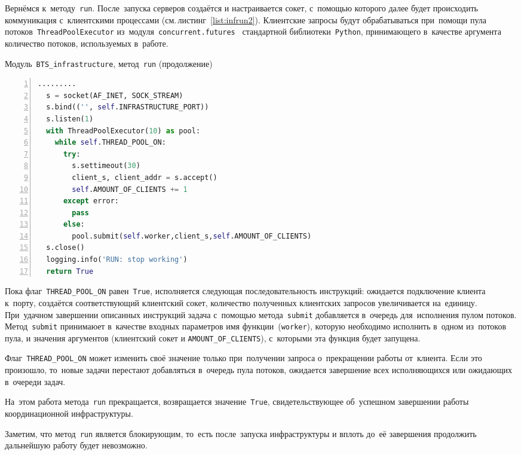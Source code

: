 Вернёмся к~методу~\texttt{run}. После~запуска серверов создаётся и настраивается сокет, с~помощью которого далее будет происходить коммуникация с~клиентскими процессами (см.\,листинг~\ref{list:infrun2}). Клиентские запросы будут обрабатываться при~помощи пула потоков~\texttt{ThreadPoolExecutor} из~модуля~\texttt{concurrent.futures}~\autocite{concurrent} стандартной библиотеки~\texttt{Python}, принимающего в~качестве аргумента количество потоков, используемых в~работе.
\begin{ListingEnv}\caption{Модуль~\texttt{BTS\_infrastructure}, метод~\texttt{run} (продолжение)}\label{list:infrun2}
	\begin{lstlisting}[language=Python, numbers=left]
  .........
  s = socket(AF_INET, SOCK_STREAM)
  s.bind(('', self.INFRASTRUCTURE_PORT))
  s.listen(1)
  with ThreadPoolExecutor(10) as pool:
    while self.THREAD_POOL_ON:
      try:
        s.settimeout(30)
        client_s, client_addr = s.accept()
        self.AMOUNT_OF_CLIENTS += 1
      except error:
        pass
      else:
        pool.submit(self.worker,client_s,self.AMOUNT_OF_CLIENTS)
  s.close()  
  logging.info('RUN: stop working')
  return True
	\end{lstlisting}
\end{ListingEnv}
Пока флаг~\texttt{THREAD_POOL_ON} равен~\texttt{True}, исполняется следующая последовательность инструкций: ожидается подключение клиента к~порту, создаётся соответствующий клиентский сокет, количество полученных клиентских запросов увеличивается на~единицу. При~удачном завершении описанных инструкций задача с~помощью метода~\texttt{submit} добавляется в~очередь для~исполнения пулом потоков. Метод~\texttt{submit} принимаюет в~качестве входных параметров имя функции~(\texttt{worker}), которую необходимо исполнить в~одном из~потоков пула, и значения аргументов (клиентский сокет и \texttt{AMOUNT_OF_CLIENTS}), с~которыми эта функция будет запущена.

Флаг~\texttt{THREAD_POOL_ON} может изменить своё значение только при~получении запроса о~прекращении работы от~клиента. Если это произошло, то~новые задачи перестают добавляться в~очередь пула потоков, ожидается завершение всех исполняющихся или ожидающих в~очереди задач.

На~этом работа метода~\texttt{run} прекращается, возвращается значение~\texttt{True}, свидетельствующее об~успешном завершении работы координационной инфраструктуры.

Заметим, что метод~\texttt{run} является блокирующим, то~есть после~запуска инфраструктуры и вплоть до~её завершения продолжить дальнейшую работу будет невозможно.

